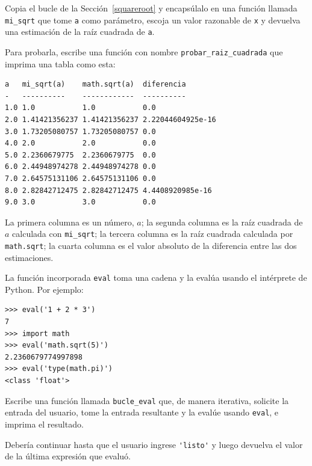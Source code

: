 \documentclass[10pt]{book}
\begin{document}
\begin{exercise}

Copia el bucle de la Sección~\ref{squareroot}
y encapsúlalo en una función llamada
\verb"mi_sqrt" que tome {\tt a} como parámetro, escoja un
valor razonable de {\tt x} y devuelva una estimación de la raíz
cuadrada de {\tt a}.  

Para probarla, escribe una función con nombre \verb"probar_raiz_cuadrada"
que imprima una tabla como esta:

\begin{verbatim}
a   mi_sqrt(a)    math.sqrt(a)  diferencia
-   ----------    ------------  ----------
1.0 1.0           1.0           0.0
2.0 1.41421356237 1.41421356237 2.22044604925e-16
3.0 1.73205080757 1.73205080757 0.0
4.0 2.0           2.0           0.0
5.0 2.2360679775  2.2360679775  0.0
6.0 2.44948974278 2.44948974278 0.0
7.0 2.64575131106 2.64575131106 0.0
8.0 2.82842712475 2.82842712475 4.4408920985e-16
9.0 3.0           3.0           0.0
\end{verbatim}
%
La primera columna es un número, $a$; la segunda columna es la raíz
cuadrada de $a$ calculada con \verb"mi_sqrt"; la tercera columna es la
raíz cuadrada calculada por {\tt math.sqrt}; la cuarta columna es el
valor absoluto de la diferencia entre las dos estimaciones.
\end{exercise}


\begin{exercise}

La función incorporada {\tt eval} toma una cadena y la evalúa
usando el intérprete de Python.  Por ejemplo:

\begin{verbatim}
>>> eval('1 + 2 * 3')
7
>>> import math
>>> eval('math.sqrt(5)')
2.2360679774997898
>>> eval('type(math.pi)')
<class 'float'>
\end{verbatim}
%
Escribe una función llamada \verb"bucle_eval" que, de manera iterativa,
solicite la entrada del usuario, tome la entrada resultante y la evalúe
usando {\tt eval}, e imprima el resultado.

Debería continuar hasta que el usuario ingrese \verb"'listo'" y luego
devuelva el valor de la última expresión que evaluó.

\end{exercise}
\end{document}
